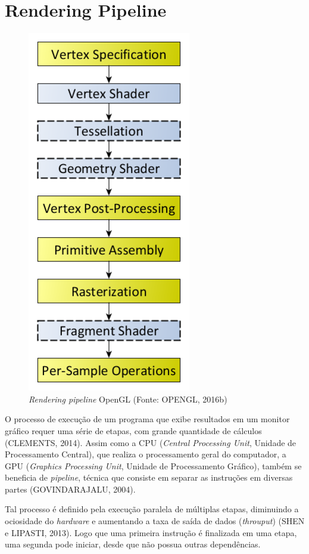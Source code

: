 \chapter{Rendering Pipeline}

\begin{figure}[H]
	\centering
	\includegraphics[scale=0.4]{imagens/openglPipeline.png}
	\caption[\textit{Rendering pipeline} OpenGL]{\textit{Rendering pipeline} OpenGL (Fonte: OPENGL, 2016b)}
	\label{fig:glpipeline}
\end{figure}

O processo de execução de um programa que exibe resultados em um monitor gráfico requer uma série de etapas, com grande quantidade de cálculos (CLEMENTS, 2014). Assim como a CPU (\textit{Central Processing Unit}, Unidade de Processamento Central), que realiza o processamento geral do computador, a GPU (\textit{Graphics Processing Unit}, Unidade de Processamento Gráfico), também se beneficia de \textit{pipeline}, técnica que consiste em separar as instruções em diversas partes (GOVINDARAJALU, 2004).

Tal processo é definido pela execução paralela de múltiplas etapas, diminuindo a ociosidade do \textit{hardware} e aumentando a taxa de saída de dados (\textit{throuput}) (SHEN e LIPASTI, 2013). Logo que uma primeira instrução é finalizada em uma etapa, uma segunda pode iniciar, desde que não possua outras dependências.

